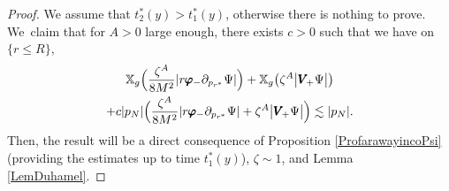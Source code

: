 \documentclass[10pt]{amsart}
\theoremstyle{plain}
\theoremstyle{definition}
\newcommand\T{{\mathbb{X}}}
\begin{document}
\begin{proof}
We assume that $t_2^*(y) >t_1^*(y)$, otherwise there is nothing to prove. We~claim that for $A >0$ large enough, there exists $c>0$ such that we have on $\{ r \leq R \}$,
\begin{multline}\label{equa:toprove}
\T_g \Bigl(\frac{\zeta^A}{8M^2}| r \pmb{\varphi}_- \partial_{p_{r^*}} \Psi| \Bigr)+\T_g \bigl(\zeta^A \big| \pmb{V}_{\! +} \Psi \big| \bigr)\\
+c|p_N| \Bigl(\frac{\zeta^A}{8M^2}| r \pmb{\varphi}_- \partial_{p_{r^*}} \Psi|+\zeta^A \big| \pmb{V}_{\! +} \Psi \big| \Bigr) \lesssim |p_N|.
\end{multline}
Then, the result will be a direct consequence of Proposition \ref{ProfarawayincoPsi} (providing the estimates up to time $t_1^*(y)$), $\zeta \sim 1$, and Lemma \ref{LemDuhamel}.


\end{proof}
\end{document}
